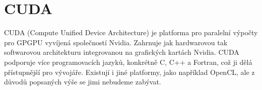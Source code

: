 \section{CUDA}
CUDA (Compute Unified Device Architecture) je platforma pro paralelní výpočty pro GPGPU vyvíjená společností Nvidia. Zahrnuje jak hardwarovou tak softwarovou architekturu integrovanou na grafických kartách Nvidia. CUDA podporuje více programovacích jazyků, konkrétně C, C++ a Fortran, což ji dělá přístupnější pro vývojáře. Existují i jiné platformy, jako například OpenCL, ale z důvodů popsaných výše se jimi nebudeme zabývat.\\

